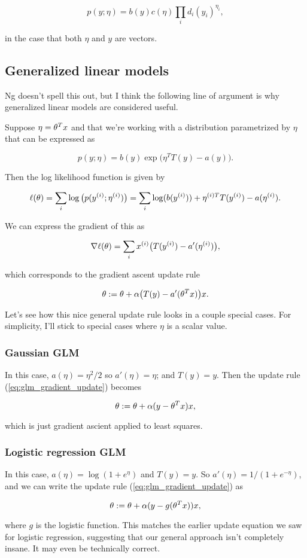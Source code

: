 \documentclass[]{article}
\begin{document}
\[p(y;\eta) = b(y)c(\eta)\prod_i d_i(y_i)^{\eta_i},\]

in the case that both \(\eta\) and \(y\) are vectors.

\subsection{Generalized linear models}\label{generalized-linear-models}

Ng doesn't spell this out, but I think the following line of argument is
why generalized linear models are considered useful.

Suppose \(\eta = \theta^Tx\) and that we're working with a distribution
parametrized by \(\eta\) that can be expressed as

\[p(y;\eta) = b(y)\exp\big(\eta^TT(y)-a(y)\big).\]

Then the log likelihood function is given by

\[\ell(\theta) = \sum_i\log\big(p(y^{(i)};\eta^{(i)})\big)
= \sum_i\log(b(y^{(i)})) + \eta^{(i)T}T(y^{(i)})-a(\eta^{(i)}).\]

We can express the gradient of this as

\[\nabla\ell(\theta) = \sum_i x^{(i)}\big(T(y^{(i)})-a'(\eta^{(i)})\big),\]

which corresponds to the gradient ascent update rule

\begin{equation}\theta := \theta + \alpha\big(T(y)-a'(\theta^Tx)\big)x.\label{eq:glm_gradient_update}\end{equation}

Let's see how this nice general update rule looks in a couple special
cases. For simplicity, I'll stick to special cases where \(\eta\) is a
scalar value.

\subsubsection{Gaussian GLM}\label{gaussian-glm}

In this case, \(a(\eta) = \eta^2/2\) so \(a'(\eta) = \eta\); and
\(T(y)=y\). Then the update rule (\ref{eq:glm_gradient_update}) becomes

\[\theta := \theta + \alpha(y-\theta^Tx)x,\]

which is just gradient ascient applied to least squares.

\subsubsection{Logistic regression GLM}\label{logistic-regression-glm}

In this case, \(a(\eta) = \log(1 + e^\eta)\) and \(T(y)=y\). So
\(a'(\eta) = 1/(1+e^{-\eta})\), and we can write the update rule
(\ref{eq:glm_gradient_update}) as

\[\theta := \theta + \alpha(y - g(\theta^Tx))x,\]

where \(g\) is the logistic function. This matches the earlier update
equation we saw for logistic regression, suggesting that our general
approach isn't completely insane. It may even be technically correct.

\hypertarget{refs}{}
\end{document}
